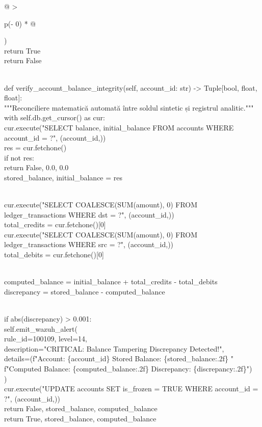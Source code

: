 \documentclass[
]{article}
\begin{document}
\begin{longtable}[]{@{}
  >{\raggedright\arraybackslash}p{(\columnwidth - 0\tabcolsep) * }@{}}
\begin{minipage}[b]{\linewidth}
)\\
return True\\
return False\\
\strut \\
def verify\_account\_balance\_integrity(self, account\_id: str)
-\textgreater{} Tuple{[}bool, float, float{]}:\\
"""Reconciliere matematică automată între soldul sintetic și registrul
analitic."""\\
with self.db.get\_cursor() as cur:\\
cur.execute("SELECT balance, initial\_balance FROM accounts WHERE
account\_id = ?", (account\_id,))\\
res = cur.fetchone()\\
if not res:\\
return False, 0.0, 0.0\\
stored\_balance, initial\_balance = res\\
\strut \\
cur.execute("SELECT COALESCE(SUM(amount), 0) FROM ledger\_transactions
WHERE dst = ?", (account\_id,))\\
total\_credits = cur.fetchone(){[}0{]}\\
cur.execute("SELECT COALESCE(SUM(amount), 0) FROM ledger\_transactions
WHERE src = ?", (account\_id,))\\
total\_debits = cur.fetchone(){[}0{]}\\
\strut \\
computed\_balance = initial\_balance + total\_credits - total\_debits\\
discrepancy = stored\_balance - computed\_balance\\
\strut \\
if abs(discrepancy) \textgreater{} 0.001:\\
self.emit\_wazuh\_alert(\\
rule\_id=100109, level=14,\\
description="CRITICAL: Balance Tampering Discrepancy Detected!",\\
details=(f"Account: \{account\_id\} \textbar{} Stored Balance:
\{stored\_balance:.2f\} \textbar{} "\\
f"Computed Balance: \{computed\_balance:.2f\} \textbar{} Discrepancy:
\{discrepancy:.2f\}")\\
)\\
cur.execute("UPDATE accounts SET is\_frozen = TRUE WHERE account\_id =
?", (account\_id,))\\
return False, stored\_balance, computed\_balance\\
return True, stored\_balance, computed\_balance\strut
\end{minipage} \\
\midrule\noalign{}
\endhead
\bottomrule\noalign{}
\endlastfoot
\end{longtable}
\end{document}
